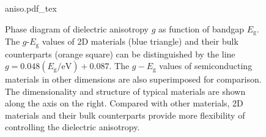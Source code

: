 \begin{figure}[!htbp]
  \centering
  {aniso.pdf_tex}
  \caption{Phase diagram of dielectric anisotropy $g$ as function of
    bandgap $E_{\mathrm{g}}$. The $g$-$E_{\mathrm{g}}$ values of 2D
    materials (blue triangle) and their bulk counterparts (orange
    square) can be distinguished by the line
    $g=0.048(E_{\mathrm{g}}/\mathrm{eV})+0.087$. The $g-E_{\mathrm{g}}$
    values of semiconducting materials in other dimensions are also
    superimposed for comparison.
    The dimensionality and structure of typical materials are
    shown along the axis on the right. Compared with other materials,
    2D materials and their bulk counterparts provide more flexibility
    of controlling the dielectric anisotropy.}
  \label{fig:diele-aniso}
\end{figure}

